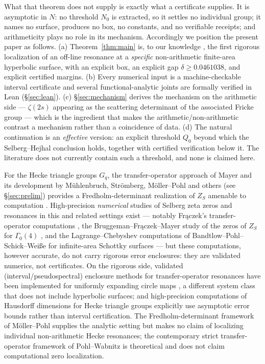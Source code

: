 \documentclass[11pt]{article}
\theoremstyle{definition}
\theoremstyle{remark}
\begin{document}
What that theorem does not supply is exactly what a certificate
supplies. It is asymptotic in $N$: no threshold $N_0$ is extracted, so
it settles no individual group; it names no surface, produces no box,
no constants, and no verifiable receipts; and arithmeticity plays no
role in its mechanism. Accordingly we position the present paper as
follows. (a) Theorem~\ref{thm:main} is, to our knowledge
\cite{NoveltyRescout}, the first rigorous localization of an off-line
resonance at a \emph{specific} non-arithmetic finite-area hyperbolic
surface, with an explicit box, an explicit gap
$\delta \ge 0.0461038$, and explicit certified margins. (b) Every
numerical input is a machine-checkable interval certificate and several
functional-analytic joints are formally verified in Lean
(\S\ref{sec:lean}). (c) \S\ref{sec:mechanism} derives the mechanism on
the arithmetic side --- $\zeta(2s)$ appearing as the scattering
determinant of the associated Fricke group --- which is the ingredient
that makes the arithmetic/non-arithmetic contrast a mechanism rather
than a coincidence of data. (d) The natural continuation is an
\emph{effective} version: an explicit threshold $Q_0$ beyond which the
Selberg--Hejhal conclusion holds, together with certified verification
below it. The literature does not currently contain such a threshold,
and none is claimed here.

For the Hecke triangle groups $G_q$, the transfer-operator approach of
Mayer and its development by M\"uhlenbruch, Str\"omberg, M\"oller--Pohl
and others (see \S\ref{sec:prelim}) provides a Fredholm-determinant
realization of $Z_S$ amenable to computation \cite{MMS,MoellerPohl13}.
High-precision \emph{numerical} studies of Selberg zeta zeros and
resonances in this and related settings exist --- notably Fr\k{a}czek's
transfer-operator computations \cite{FraczekBook17}, the
Bruggeman--Fr\k{a}czek--Mayer study of the zeros of $Z_S$ for
$\Gamma_0(4)$ \cite{BFM13}, and the Lagrange--Chebyshev computations of
Bandtlow--Pohl--Schick--Wei{\ss}e for infinite-area Schottky surfaces
\cite{BandtlowPohlSchickWeisse21}
--- but these computations, however accurate, do not carry rigorous
error enclosures: they are validated numerics, not certificates. On the
rigorous side, validated (interval/pseudospectral) enclosure methods
for transfer-operator resonances have been implemented for uniformly
expanding circle maps \cite{Pseudospectral25}, a different system class
that does not include hyperbolic surfaces; and high-precision
computations of Hausdorff dimensions for Hecke triangle groups
\cite{HausdorffDim25} explicitly use asymptotic error bounds rather than
interval certification. The Fredholm-determinant framework of
M\"oller--Pohl \cite{MoellerPohl13} supplies the analytic setting but
makes no claim of localizing individual non-arithmetic Hecke
resonances; the contemporary strict
transfer-operator framework of Pohl--Wabnitz \cite{PohlWabnitz26} is
theoretical and does not claim computational zero localization.
\end{document}
